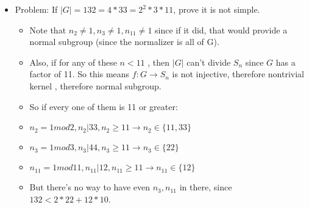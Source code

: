 \documentclass[11pt, oneside]{article}   	%
\begin{document}
\begin{itemize}
\item Problem: If $|G| = 132 = 4 * 33 = 2^2 * 3 * 11$, prove it is not simple.
\begin{itemize}
\item Note that $n_2 \neq 1, n_3 \neq 1, n_{11} \neq 1$ since if it did, that would provide a normal subgroup (since the normalizer is all of G).
\item Also, if for any of these $n < 11$ , then $|G|$ can't divide $S_n$ since $G$ has a factor of 11.  So this means $f: G \rightarrow S_n$ is not injective, therefore nontrivial kernel , therefore normal subgroup.
\item So if every one of them is 11 or greater:
\item $n_2 = 1 mod 2, n_2 | 33, n_2 \geq 11\rightarrow n_2 \in \{11, 33\}$
\item $n_3 = 1 mod 3, n_3 | 44, n_3 \geq 11\rightarrow n_3 \in \{22\}$
\item $n_{11} = 1 mod 11, n_{11} | 12, n_{11} \geq 11 \rightarrow n_{11} \in \{12\}$
\item But there's no way to have even $n_3, n_11$ in there, since $132 < 2 * 22 + 12 * 10$.
\end{itemize}


\end{itemize}
\end{document}
